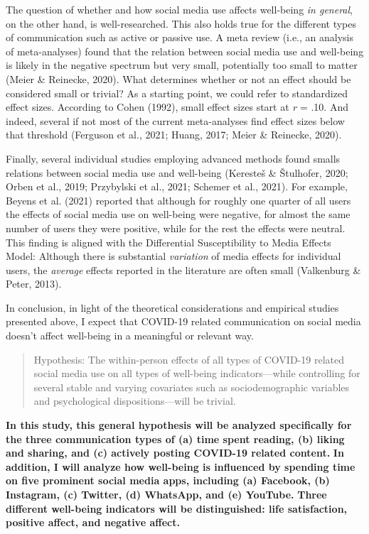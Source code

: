 \documentclass[
  man,mask]{apa7}
\begin{document}
The question of whether and how social media use affects well-being \emph{in general}, on the other hand, is well-researched.
This also holds true for the different types of communication such as active or passive use.
A meta review (i.e., an analysis of meta-analyses) found that the relation between social media use and well-being is likely in the negative spectrum but very small, potentially too small to matter (Meier \& Reinecke, 2020).
What determines whether or not an effect should be considered small or trivial?
As a starting point, we could refer to standardized effect sizes.
According to Cohen (1992), small effect sizes start at \emph{r} = .10.
And indeed, several if not most of the current meta-analyses find effect sizes below that threshold (Ferguson et al., 2021; Huang, 2017; Meier \& Reinecke, 2020).

Finally, several individual studies employing advanced methods found smalls relations between social media use and well-being (Keresteš \& Štulhofer, 2020; Orben et al., 2019; Przybylski et al., 2021; Schemer et al., 2021).
For example, Beyens et al. (2021) reported that although for roughly one quarter of all users the effects of social media use on well-being were negative, for almost the same number of users they were positive, while for the rest the effects were neutral.
This finding is aligned with the Differential Susceptibility to Media Effects Model:
Although there is substantial \emph{variation} of media effects for individual users, the \emph{average} effects reported in the literature are often small (Valkenburg \& Peter, 2013).

In conclusion, in light of the theoretical considerations and empirical studies presented above, I expect that COVID-19 related communication on social media doesn't affect well-being in a meaningful or relevant way.

\begin{quote}
Hypothesis: The within-person effects of all types of COVID-19 related social media use on all types of well-being indicators---while controlling for several stable and varying covariates such as sociodemographic variables and psychological dispositions---will be trivial.
\end{quote}

\textbf{In this study, this general hypothesis will be analyzed specifically for the three communication types of (a) time spent reading, (b) liking and sharing, and (c) actively posting COVID-19 related content.}
\textbf{In addition, I will analyze how well-being is influenced by spending time on five prominent social media apps, including (a) Facebook, (b) Instagram, (c) Twitter, (d) WhatsApp, and (e) YouTube.}
\textbf{Three different well-being indicators will be distinguished: life satisfaction, positive affect, and negative affect.}
\end{document}

